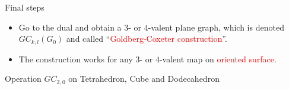 \documentclass[%
pdf,
colorBG,
slideColor,
]{prosper}
\begin{document}
\begin{slide}{Final steps}

\begin{itemize}
\item Go to the dual and obtain a $3$- or $4$-valent plane graph, which is denoted $GC_{k,l}(G_0)$ and called ``\textcolor{red}{Goldberg-Coxeter construction}''.
\item The construction works for any $3$- or $4$-valent map on \textcolor{red}{oriented surface}.
\end{itemize}
\vspace{-2mm}
\begin{center}
\begin{minipage}[t]{7cm}
\centering
\epsfxsize=6cm
\par
\end{minipage}
\begin{minipage}[t]{3cm}
\centering
\epsfxsize=2.7cm
\par
\end{minipage}
\end{center}
\begin{center}
Operation $GC_{2,0}$ on Tetrahedron, Cube and Dodecahedron
\end{center}




\end{slide}









\end{document}
